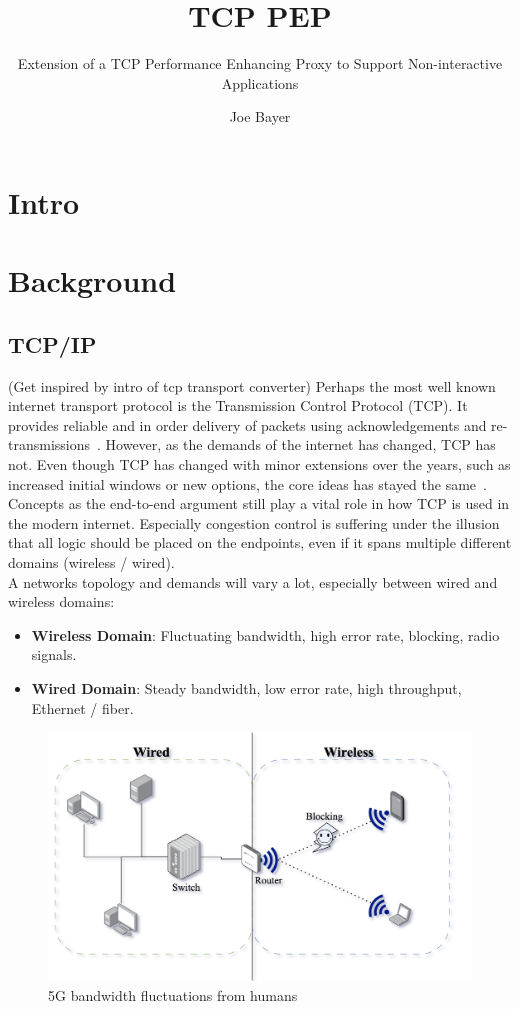 \documentclass[a4paper,english, 11pt]{report}
\author{Joe Bayer}
\title{TCP PEP}
\subtitle{Extension of a TCP Performance Enhancing Proxy to
Support Non-interactive Applications}
\begin{document}
\uiomasterfp[program={Informatics: Programming and System Architecture}, supervisors={Michael Welzl\and Kristjon Ciko}]

\tableofcontents

\chapter{Intro}

\chapter{Background}

\section{TCP/IP}
(Get inspired by intro of tcp transport converter)
Perhaps the most well known internet transport protocol is the Transmission Control Protocol (TCP). It provides reliable and in order delivery of packets using acknowledgements and re-transmissions~\cite{Eddy_2022}. However, as the demands of the internet has changed, TCP has not. Even though TCP has changed with minor extensions over the years, such as increased initial windows or new options, the core ideas has stayed the same~\cite{rfc8803}. Concepts as the end-to-end argument still play a vital role in how TCP is used in the modern internet. Especially congestion control is suffering under the illusion that all logic should be placed on the endpoints, even if it spans multiple different domains (wireless / wired).\\

A networks topology and demands will vary a lot, especially between wired and wireless domains:
\begin{itemize}
  \item \textbf{Wireless Domain}: Fluctuating bandwidth, high error rate, blocking, radio signals.
  \item \textbf{Wired Domain}: Steady bandwidth, low error rate, high throughput, Ethernet / fiber.
\end{itemize}

\begin{figure}[h] %
	\centering
	\includegraphics[scale=0.65]{../diagrams/drawio/domains.png}
  	\caption{5G bandwidth fluctuations from humans}
  	\label{fig:domains}
\end{figure}
\end{document}
